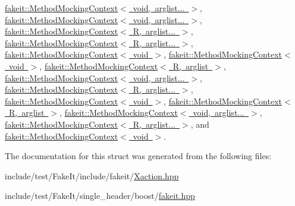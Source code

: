 \mbox{\hyperlink{classfakeit_1_1MethodMockingContext_a68a56b3fbd0a2b654a1c72de66e68a71}{fakeit\+::\+Method\+Mocking\+Context$<$ void, arglist... $>$}}, \mbox{\hyperlink{classfakeit_1_1MethodMockingContext_a68a56b3fbd0a2b654a1c72de66e68a71}{fakeit\+::\+Method\+Mocking\+Context$<$ void, arglist... $>$}}, \mbox{\hyperlink{classfakeit_1_1MethodMockingContext_a68a56b3fbd0a2b654a1c72de66e68a71}{fakeit\+::\+Method\+Mocking\+Context$<$ R, arglist... $>$}}, \mbox{\hyperlink{classfakeit_1_1MethodMockingContext_a68a56b3fbd0a2b654a1c72de66e68a71}{fakeit\+::\+Method\+Mocking\+Context$<$ R, arglist... $>$}}, \mbox{\hyperlink{classfakeit_1_1MethodMockingContext_a68a56b3fbd0a2b654a1c72de66e68a71}{fakeit\+::\+Method\+Mocking\+Context$<$ void $>$}}, \mbox{\hyperlink{classfakeit_1_1MethodMockingContext_a68a56b3fbd0a2b654a1c72de66e68a71}{fakeit\+::\+Method\+Mocking\+Context$<$ void $>$}}, \mbox{\hyperlink{classfakeit_1_1MethodMockingContext_a68a56b3fbd0a2b654a1c72de66e68a71}{fakeit\+::\+Method\+Mocking\+Context$<$ R, arglist $>$}}, \mbox{\hyperlink{classfakeit_1_1MethodMockingContext_a68a56b3fbd0a2b654a1c72de66e68a71}{fakeit\+::\+Method\+Mocking\+Context$<$ void, arglist... $>$}}, \mbox{\hyperlink{classfakeit_1_1MethodMockingContext_a68a56b3fbd0a2b654a1c72de66e68a71}{fakeit\+::\+Method\+Mocking\+Context$<$ R, arglist... $>$}}, \mbox{\hyperlink{classfakeit_1_1MethodMockingContext_a68a56b3fbd0a2b654a1c72de66e68a71}{fakeit\+::\+Method\+Mocking\+Context$<$ void $>$}}, \mbox{\hyperlink{classfakeit_1_1MethodMockingContext_a68a56b3fbd0a2b654a1c72de66e68a71}{fakeit\+::\+Method\+Mocking\+Context$<$ R, arglist $>$}}, \mbox{\hyperlink{classfakeit_1_1MethodMockingContext_a68a56b3fbd0a2b654a1c72de66e68a71}{fakeit\+::\+Method\+Mocking\+Context$<$ void, arglist... $>$}}, \mbox{\hyperlink{classfakeit_1_1MethodMockingContext_a68a56b3fbd0a2b654a1c72de66e68a71}{fakeit\+::\+Method\+Mocking\+Context$<$ R, arglist... $>$}}, and \mbox{\hyperlink{classfakeit_1_1MethodMockingContext_a68a56b3fbd0a2b654a1c72de66e68a71}{fakeit\+::\+Method\+Mocking\+Context$<$ void $>$}}.



The documentation for this struct was generated from the following files\+:\begin{DoxyCompactItemize}
\item 
include/test/\+Fake\+It/include/fakeit/\mbox{\hyperlink{Xaction_8hpp}{Xaction.\+hpp}}\item 
include/test/\+Fake\+It/single\+\_\+header/boost/\mbox{\hyperlink{single__header_2boost_2fakeit_8hpp}{fakeit.\+hpp}}\end{DoxyCompactItemize}
